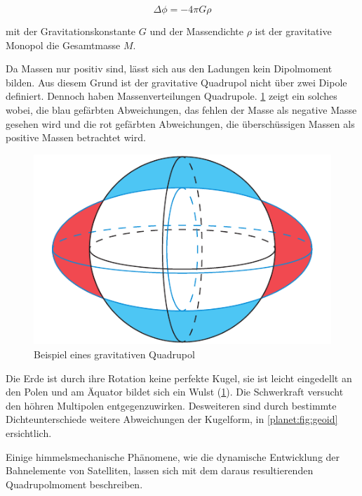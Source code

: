 \begin{equation*}
    \Delta \phi = -4\pi G\rho
\end{equation*}

\noindent
mit der Gravitationskonstante \(G\) und der Massendichte \(\rho\) ist der gravitative Monopol die Gesamtmasse \(M\).

Da Massen nur positiv sind, lässt sich aus den Ladungen kein Dipolmoment bilden.
Aus diesem Grund ist der gravitative Quadrupol nicht über zwei Dipole definiert.
Dennoch haben Massenverteilungen Quadrupole.
\cref{planet:fig:quadroearth} zeigt ein solches wobei, die blau gefärbten Abweichungen, das fehlen der Masse als negative Masse gesehen wird und die rot gefärbten Abweichungen, die überschüssigen Massen als positive Massen betrachtet wird.  

\begin{figure}[h]
    \centering
    \includegraphics[width=0.60\linewidth]{papers/planet/pictures/Quadroearth.pdf}
    \caption{Beispiel eines gravitativen Quadrupol
        \label{planet:fig:quadroearth}}
\end{figure}

\begin{beispiel}
    Die Erde ist durch ihre Rotation keine perfekte Kugel, sie ist leicht eingedellt an den Polen und am Äquator bildet sich ein Wulst (\cref{planet:fig:quadroearth}).
    Die Schwerkraft versucht den höhren Multipolen entgegenzuwirken.
    Desweiteren sind durch bestimmte Dichteunterschiede weitere Abweichungen der Kugelform, in \cref{planet:fig:geoid} ersichtlich.
\end{beispiel}

Einige himmelsmechanische Phänomene, wie die dynamische Entwicklung der Bahnelemente von Satelliten, lassen sich mit dem daraus resultierenden Quadrupolmoment beschreiben.
